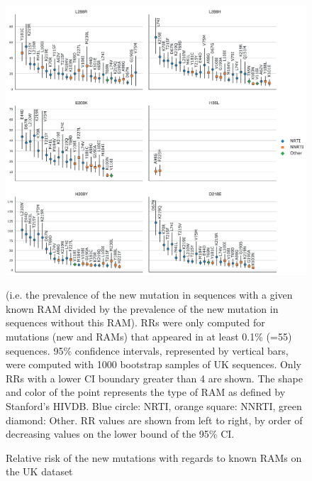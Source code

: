 \documentclass[
  11,
]{scrbook}
\begin{document}
\begin{figure}
{
\centering
\includegraphics[width=\linewidth]{./figures/HIV-DRMs/Fig3.png}
}
\caption{Relative risk of the new mutations with regards to known RAMs on the UK dataset}{
(i.e. the prevalence of the new mutation in sequences with a given known RAM divided by the prevalence of the new mutation in sequences without this RAM). RRs were only computed for mutations (new and RAMs) that appeared in at least 0.1\% (=55) sequences. 95\% confidence intervals, represented by vertical bars, were computed with 1000 bootstrap samples of UK sequences. Only RRs with a lower CI boundary greater than 4 are shown. The shape and color of the point represents the type of RAM as defined by Stanford’s HIVDB. Blue circle: NRTI, orange square: NNRTI, green diamond: Other. RR values are shown from left to right, by order of decreasing values on the lower bound of the 95\% CI.}
\label{fig:figUkRatios}
\end{figure}
\end{document}
